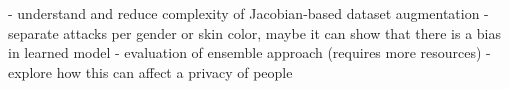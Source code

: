 - understand and reduce complexity of Jacobian-based dataset augmentation
- separate attacks per gender or skin color, maybe it can show that there is a bias in learned model
- evaluation of ensemble approach (requires more resources)
- explore how this can affect a privacy of people